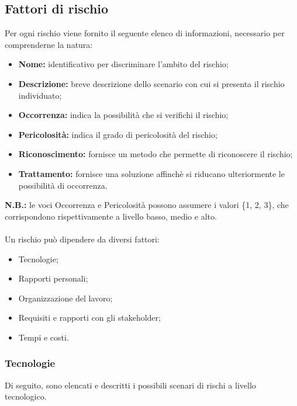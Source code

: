 \subsection{Fattori di rischio}

Per ogni rischio viene fornito il seguente elenco di informazioni, necessario per comprenderne la natura:
\begin{itemize}
	\item \textbf{Nome:} identificativo per discriminare l'ambito del rischio;
	\item \textbf{Descrizione:} breve descrizione dello scenario con cui si presenta il rischio individuato;
	\item \textbf{Occorrenza:} indica la possibilità che si verifichi il rischio;
	\item \textbf{Pericolosità:} indica il grado di pericolosità del rischio;
	\item \textbf{Riconoscimento:} fornisce un metodo che permette di riconoscere il rischio;
	\item \textbf{Trattamento:} fornisce una soluzione affinchè si riducano ulteriormente le possibilità di occorrenza.
\end{itemize}
\textbf{N.B.:} le voci Occorrenza e Pericolosità possono assumere i valori \{1, 2, 3\}, che corrispondono rispettivamente a livello basso, medio e alto.\\\\
Un rischio può dipendere da diversi fattori:
\begin{itemize}
	\item Tecnologie;
	\item Rapporti personali;
	\item Organizzazione del lavoro;
	\item Requisiti e rapporti con gli stakeholder;
	\item Tempi e costi.
\end{itemize}

\subsubsection{Tecnologie}

Di seguito, sono elencati e descritti i possibili scenari di rischi a livello tecnologico.

